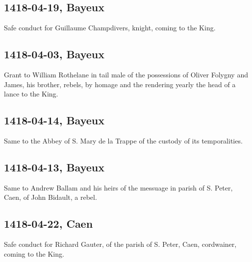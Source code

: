\documentclass[a4paper,12pt,twoside]{book}
\begin{document}
                
                \subsection{1418-04-19, Bayeux}
                
                
                     Safe conduct for Guillaume Champdivers, knight, coming to the King.
                  
                
                \subsection{1418-04-03, Bayeux}
                
                
                     Grant to William Rothelane in tail male of the possessions of Oliver Folygny and James, his brother, rebels, by homage and the rendering yearly the head of a lance to the King.
                  
                
                \subsection{1418-04-14, Bayeux}
                
                
                     Same to the Abbey of S. Mary de la Trappe of the custody of its temporalities.
                  
                
                \subsection{1418-04-13, Bayeux}
                
                
                     Same to Andrew Ballam and his heirs of the messuage in parish of S. Peter, Caen, of John Bidault, a rebel.
                  
                
                \subsection{1418-04-22, Caen}
                
                
                     Safe conduct for Richard Gauter, of the parish of S. Peter, Caen, cordwainer, coming to the King.
                  
\end{document}
